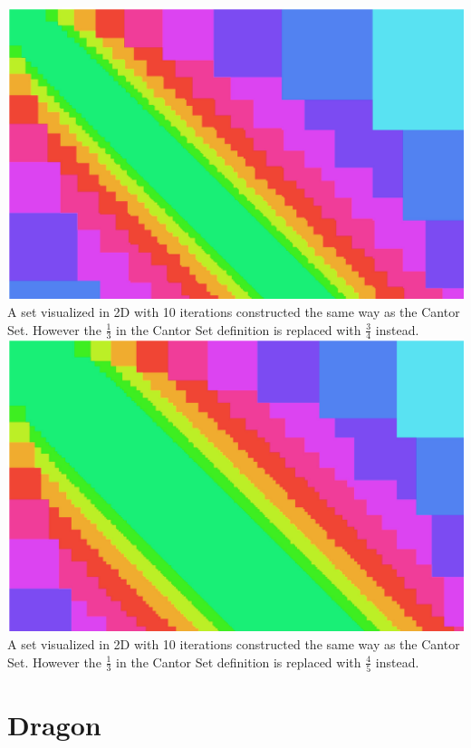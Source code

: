 \documentclass[11pt]{ekblite}
\begin{document}
	\\[0.2in]\includegraphics[scale=0.2]{img/c3.jpg}
	\\A set visualized in 2D with 10 iterations constructed the same way as the Cantor Set. However the $\frac{1}{3}$ in the Cantor Set definition is replaced with $\frac{3}{4}$ instead. 
	\\[0.2in]\includegraphics[scale=0.2]{img/c4.jpg}
	\\A set visualized in 2D with 10 iterations constructed the same way as the Cantor Set. However the $\frac{1}{3}$ in the Cantor Set definition is replaced with $\frac{4}{5}$ instead. 
\newpage
\section{Dragon}

\newpage

\end{document}
